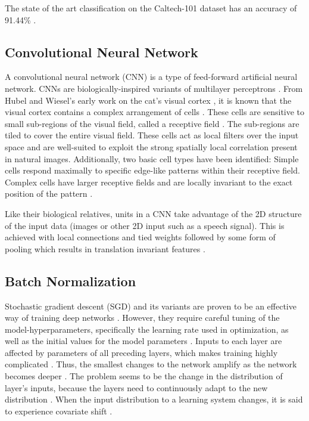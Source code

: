 \documentclass[a4paper, 11pt]{article}
\begin{document}
The state of the art classification on the Caltech-101 dataset has an accuracy of 91.44\% \cite{He2014}.


\subsection{Convolutional Neural Network}
A convolutional neural network (CNN) is a type of feed-forward artificial neural network.
CNNs are biologically-inspired variants of multilayer perceptrons \cite{DLCNN}.
From Hubel and Wiesel's early work on the cat's visual cortex \cite{Hubel1968}, it is known that the visual cortex contains a complex arrangement of cells \cite{DLCNN}.
These cells are sensitive to small sub-regions of the visual field, called a receptive field \cite{DLCNN}.
The sub-regions are tiled to cover the entire visual field.
These cells act as local filters over the input space and are well-suited to exploit the strong spatially local correlation present in natural images.
Additionally, two basic cell types have been identified: Simple cells respond maximally to specific edge-like patterns within their receptive field.
Complex cells have larger receptive fields and are locally invariant to the exact position of the pattern \cite{DLCNN}.

Like their biological relatives, units in a CNN take advantage of the 2D structure of the input data (images or other 2D input such as a speech signal).
This is achieved with local connections and tied weights followed by some form of pooling which results in translation invariant features \cite{StanfordTutCNN2015}.


\subsection{Batch Normalization}
Stochastic gradient descent (SGD) and its variants are proven to be an effective way of training deep networks \cite{Ioffe2015}.
However, they require careful tuning of the model-hyperparameters, specifically the learning rate used in optimization, as well as the initial values for the model parameters \cite{Ioffe2015}.
Inputs to each layer are affected by parameters of all preceding layers, which makes training highly complicated \cite{Ioffe2015}.
Thus, the smallest changes to the network amplify as the network becomes deeper \cite{Ioffe2015}.
The problem seems to be the change in the distribution of layer's inputs, because the layers need to continuously adapt to the new distribution \cite{Ioffe2015}.
When the input distribution to a learning system changes, it is said to experience covariate shift \cite{Shimodaira2000}.
\end{document}

